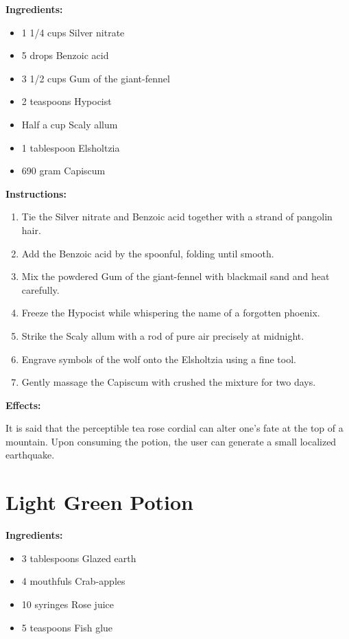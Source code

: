 \documentclass{article}
\begin{document}
\textbf{Ingredients:}

\begin{itemize}
  \item 1 1/4 cups Silver nitrate
  \item 5 drops Benzoic acid
  \item 3 1/2 cups Gum of the giant-fennel
  \item 2 teaspoons Hypocist
  \item Half a cup Scaly allum
  \item 1 tablespoon Elsholtzia
  \item 690 gram Capiscum
\end{itemize}

\textbf{Instructions:}

\begin{enumerate}
  \item Tie the Silver nitrate and Benzoic acid together with a strand of pangolin hair.
  \item Add the Benzoic acid by the spoonful, folding until smooth.
  \item Mix the powdered Gum of the giant-fennel with blackmail sand and heat carefully.
  \item Freeze the Hypocist while whispering the name of a forgotten phoenix.
  \item Strike the Scaly allum with a rod of pure air precisely at midnight.
  \item Engrave symbols of the wolf onto the Elsholtzia using a fine tool.
  \item Gently massage the Capiscum with crushed the mixture for two days.
\end{enumerate}

\textbf{Effects:}

It is said that the perceptible tea rose cordial can alter one's fate at the top of a mountain. Upon consuming the potion, the user can generate a small localized earthquake.

\newpage
\section*{Light Green Potion}

\textbf{Ingredients:}

\begin{itemize}
  \item 3 tablespoons Glazed earth
  \item 4 mouthfuls Crab-apples
  \item 10 syringes Rose juice
  \item 5 teaspoons Fish glue
\end{itemize}
\end{document}
